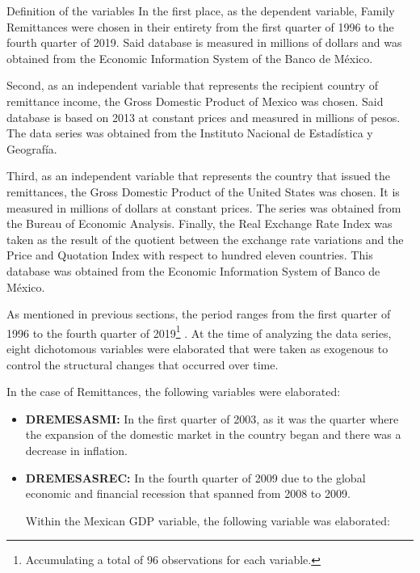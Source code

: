     \frame{\sectionpage}
    \begin{frame}{Definition of the variables}
In the first place, as the dependent variable, Family Remittances were chosen in their entirety from the first quarter of 1996 to the fourth quarter of 2019. Said database is measured in millions of dollars and was obtained from the Economic Information System of the Banco de México.\par
Second, as an independent variable that represents the recipient country of remittance income, the Gross Domestic Product of Mexico was chosen. Said database is based on 2013 at constant prices and measured in millions of pesos. The data series was obtained from the Instituto Nacional de Estadística y Geografía.\par
Third, as an independent variable that represents the country that issued the remittances, the Gross Domestic Product of the United States was chosen. It is measured in millions of dollars at constant prices. The series was obtained from the Bureau of Economic Analysis. Finally, the Real Exchange Rate Index was taken as the result of the quotient between the exchange rate variations and the Price and Quotation Index with respect to hundred eleven countries. This database was obtained from the Economic Information System of Banco de México.\par
As mentioned in previous sections, the period ranges from the first quarter of 1996 to the fourth quarter of 2019\footnote{Accumulating a total of 96 observations for each variable.} . At the time of analyzing the data series, eight dichotomous variables were elaborated that were taken as exogenous to control the structural changes that occurred over time. \par
In the case of Remittances, the following variables were elaborated:\par
\begin{itemize}
\item \textbf{DREMESASMI:} In the first quarter of 2003, as it was the quarter where the expansion of the domestic market in the country began and there was a decrease in inflation.\par
\item \textbf{DREMESASREC:} In the fourth quarter of 2009 due to the global economic and financial recession that spanned from 2008 to 2009.\par

 Within the Mexican GDP variable, the following variable was elaborated:\par
 

\end{itemize}
\end{frame}
